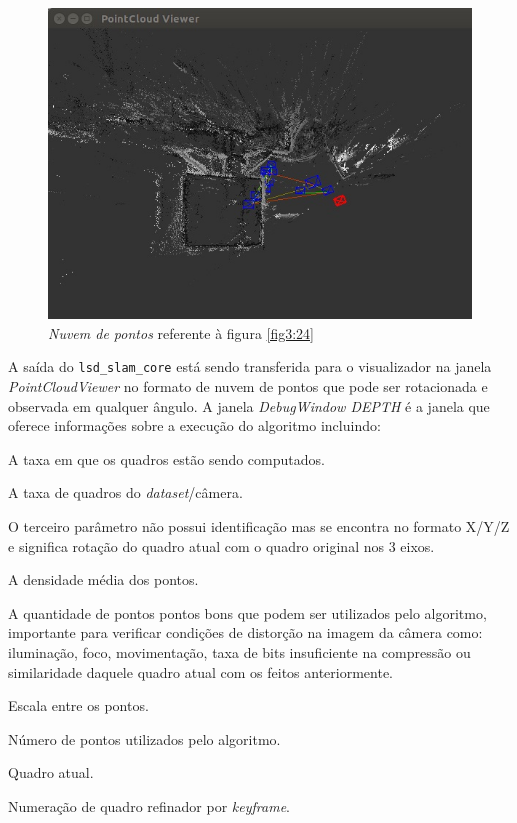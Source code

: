 \begin{figure}[H]
	\centering
		\includegraphics[width= \textwidth]{Imagens/figura3-25.jpg}
	\caption{\textit{Nuvem de pontos} referente à figura \ref{fig3:24}}
	\label{fig3:25}
\end{figure}

A saída do \texttt{lsd\_slam\_core} está sendo transferida para o visualizador na janela \textit{PointCloudViewer} no formato de nuvem de pontos que pode ser rotacionada e observada em qualquer ângulo. A janela \textit{DebugWindow DEPTH} é a janela que oferece informações sobre a execução do algoritmo incluindo:

\begin{description}
	\item[Map upd :]{A taxa em que os quadros estão sendo computados.}
	\item[Trk :]{A taxa de quadros do \textit{dataset}/câmera.}
	\item[X/Y/Z :]{O terceiro parâmetro não possui identificação mas se encontra no formato X/Y/Z e significa rotação do quadro atual com o quadro original nos 3 eixos.}
	\item[Dens X\% :]{A densidade média dos pontos.}
	\item[Good X\% :]{ A quantidade de pontos pontos bons que podem ser utilizados pelo algoritmo, importante para verificar condições de distorção na imagem da câmera como: iluminação, foco, movimentação, taxa de bits insuficiente na compressão ou similaridade daquele quadro atual com os feitos anteriormente.}
	\item[Scale X\% :]{Escala entre os pontos.}
	\item{Número de pontos utilizados pelo algoritmo.}
	\item{Quadro atual.}
	\item{Numeração de quadro refinador por \textit{keyframe}.}
\end{description}


